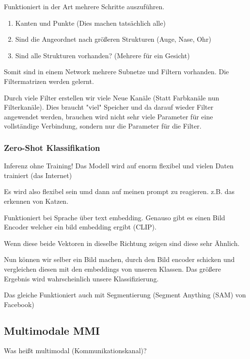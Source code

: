 \documentclass[a4paper]{article}
\begin{document}
Funktioniert in der Art mehrere Schritte auszuführen. 

\begin{enumerate}
    \item Kanten und Punkte (Dies machen tatsächlich alle)
    \item Sind die Angeordnet nach größeren Strukturen (Auge, Nase, Ohr)
    \item Sind alle Strukturen vorhanden? (Mehrere für ein Gesicht)
\end{enumerate}

Somit sind in einem Network mehrere Subnetze und Filtern vorhanden. Die Filtermatrizen werden gelernt.

Durch viele Filter erstellen wir viele Neue Kanäle (Statt Farbkanäle nun Filterkanäle). Dies braucht "viel" Speicher und da darauf wieder Filter angewendet werden, brauchen wird nicht sehr viele Parameter für eine vollständige Verbindung, sondern nur die Parameter für die Filter.


\subsubsection{Zero-Shot Klassifikation}

Inferenz ohne Training! Das Modell wird auf enorm flexibel und vielen Daten trainiert (das Internet)

Es wird also flexibel sein umd dann auf meinen prompt zu reagieren. z.B. das erkennen von Katzen.

Funktioniert bei Sprache über text embedding. Genauso gibt es einen Bild Encoder welcher ein bild embedding ergibt (CLIP).

Wenn diese beide Vektoren in dieselbe Richtung zeigen sind diese sehr Ähnlich.

Nun können wir selber ein Bild machen, durch den Bild encoder schicken und vergleichen diesen mit den embeddings von unseren Klassen. Das größere Ergebnis wird wahrscheinlich unsere Klassifizierung.

Das gleiche Funktioniert auch mit Segmentierung (Segment Anything (SAM) von Facebook)

\subsection{Multimodale MMI}

Was heißt multimodal (Kommunikationskanal)?
\end{document}
